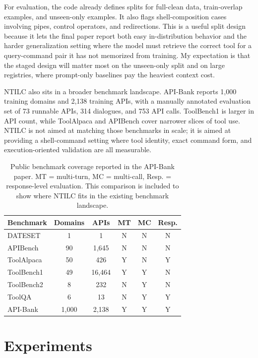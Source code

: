 \documentclass[10pt,twocolumn,letterpaper]{article}
\begin{document}
For evaluation, the code already defines splits for full-clean data, train-overlap examples, and unseen-only examples. It also flags shell-composition cases involving pipes, control operators, and redirections. This is a useful split design because it lets the final paper report both easy in-distribution behavior and the harder generalization setting where the model must retrieve the correct tool for a query-command pair it has not memorized from training. My expectation is that the staged design will matter most on the unseen-only split and on large registries, where prompt-only baselines pay the heaviest context cost.

NTILC also sits in a broader benchmark landscape. API-Bank reports 1,000 training domains and 2,138 training APIs, with a manually annotated evaluation set of 73 runnable APIs, 314 dialogues, and 753 API calls. ToolBench1 is larger in API count, while ToolAlpaca and APIBench cover narrower slices of tool use. NTILC is not aimed at matching those benchmarks in scale; it is aimed at providing a shell-command setting where tool identity, exact command form, and execution-oriented validation are all measurable.

\begin{table}[t]
\centering
\small
\setlength{\tabcolsep}{4pt}
\begin{tabular}{lccccc}
\toprule
Benchmark & Domains & APIs & MT & MC & Resp. \\
\midrule
DATESET & 1 & 1 & N & N & N \\
APIBench & 90 & 1,645 & N & N & N \\
ToolAlpaca & 50 & 426 & Y & N & Y \\
ToolBench1 & 49 & 16,464 & Y & Y & N \\
ToolBench2 & 8 & 232 & N & Y & N \\
ToolQA & 6 & 13 & N & Y & Y \\
API-Bank & 1,000 & 2,138 & Y & Y & Y \\
\bottomrule
\end{tabular}
\caption{Public benchmark coverage reported in the API-Bank paper. MT = multi-turn, MC = multi-call, Resp. = response-level evaluation. This comparison is included to show where NTILC fits in the existing benchmark landscape.}
\label{tab:benchmark-landscape}
\end{table}

\section{Experiments}
\end{document}
